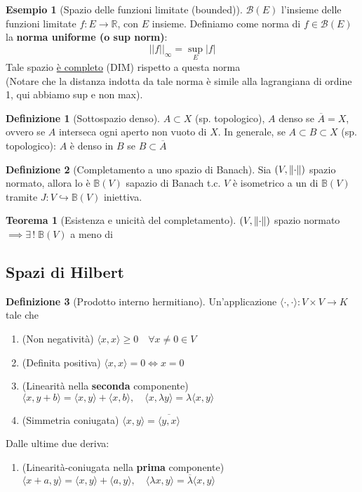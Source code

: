 \documentclass[a4paper,10pt]{article}
\theoremstyle{definition}
\newcommand{\re}{\mathbb{R}} %
\newcommand{\inj}{\hookrightarrow} %
\newcommand{\inner}{\langle\cdot{,}\cdot\rangle} %
\newcommand{\inn}[2]{\langle #1, #2 \rangle}
\theoremstyle{indentdefinition}
\newtheorem{defn}{Definizione}[section]
\theoremstyle{indenttheorem}
\newtheorem{thm}{Teorema}
\theoremstyle{myremark}
\newtheorem{example*}{Esempio}
\theoremstyle{indentgeneral}
\begin{document}
\begin{example*}[Spazio delle funzioni limitate (bounded)] $\mathcal{B}(E)$ l'insieme delle funzioni limitate $f: E\to\re$, con $E$ insieme. Definiamo come norma di $f\in\mathcal{B}(E)$ la \textbf{norma uniforme (o sup norm)}:
$$||f||_{\infty}=\sup_E|f|$$
Tale spazio \underline{è completo} (DIM) rispetto a questa norma \\
(Notare che la distanza indotta da tale norma è simile alla lagrangiana di ordine 1, qui abbiamo sup e non max). 
\end{example*}

\begin{defn}[Sottospazio denso]\label{defn-sottospazio-denso}
     $A \subset X$ (sp. topologico), $A$ denso se $\overline{A}=X$, ovvero se $A$ interseca ogni aperto non vuoto di $X$. In generale, se $A \subset B \subset X$ (sp. topologico): $A$ è denso in $B$ se $B \subset \overline{A}$
\end{defn}

\begin{defn}[Completamento a uno spazio di Banach] \label{defn-completamento-Banach}
    Sia $(V, \norm{\cdot})$ spazio normato, allora lo è $\mathbb{B}(V)$ sapazio di Banach t.c. $V$ è isometrico a un  di $\mathbb{B}(V)$ tramite $J:V\inj \mathbb{B}(V)$ iniettiva.
\end{defn}

\begin{thm}[Esistenza e unicità del completamento]
    $(V, \norm{\cdot})$ spazio normato $\implies\exists\,!\;\mathbb{B}(V)$  a meno di 
\end{thm}

\subsection{Spazi di Hilbert}
\begin{defn}[Prodotto interno hermitiano]
    Un'applicazione $\inner: V\times V \to K$ tale che
    \begin{enumerate}
        \item (Non negatività) $\inn{x}{x}\ge 0 \quad \forall x \ne 0 \in V$
        \item (Definita positiva) $\inn{x}{x}=0 \iff x=0$
        \item (Linearità nella \textbf{seconda} componente) $\inn{x}{y+b}=\inn{x}{y}+\inn{x}{b}, \quad \inn{x}{\lambda y}=\lambda\inn{x}{y}$
        
        \item (Simmetria coniugata) $\inn{x}{y}=\overline{\inn{y}{x}}$
    \end{enumerate}
    Dalle ultime due deriva:
    \begin{enumerate}[resume]
   \item (Linearità-coniugata nella \textbf{prima} componente) $\inn{x+a}{y}=\inn{x}{y}+\inn{a}{y}, \quad \inn{\lambda x}{y}=\overline{\lambda}\inn{x}{y}$
\end{enumerate}
\end{defn}
\end{document}
